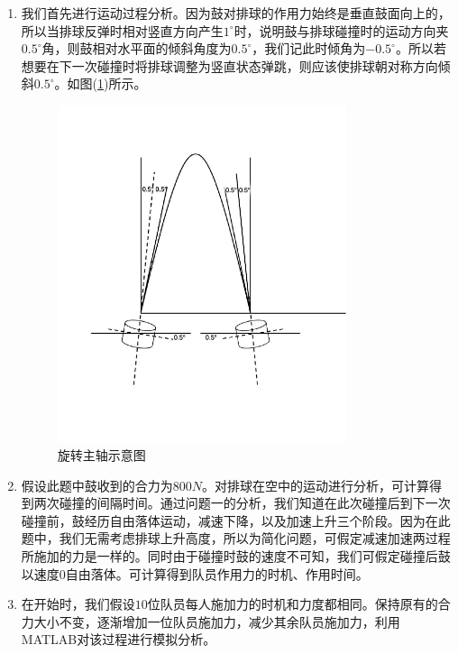 \documentclass{cumcm}
\begin{document}
\begin{enumerate}
\item 我们首先进行运动过程分析。因为鼓对排球的作用力始终是垂直鼓面向上的，所以当排球反弹时相对竖直方向产生$1^{\circ}$时，说明鼓与排球碰撞时的运动方向夹$0.5^{\circ}$角，则鼓相对水平面的倾斜角度为$0.5^{\circ}$，我们记此时倾角为$-0.5^{\circ}$。所以若想要在下一次碰撞时将排球调整为竖直状态弹跳，则应该使排球朝对称方向倾斜$0.5^{\circ}$。如图(\ref{fig:exercise})所示。
\begin{figure}[H]
\centering
\includegraphics[width=0.8\textwidth]{img/exercise.pdf}
\caption{旋转主轴示意图}\label{fig:exercise}
\end{figure}
\item 假设此题中鼓收到的合力为$800N$。对排球在空中的运动进行分析，可计算得到两次碰撞的间隔时间。通过问题一的分析，我们知道在此次碰撞后到下一次碰撞前，鼓经历自由落体运动，减速下降，以及加速上升三个阶段。因为在此题中，我们无需考虑排球上升高度，所以为简化问题，可假定减速加速两过程所施加的力是一样的。同时由于碰撞时鼓的速度不可知，我们可假定碰撞后鼓以速度0自由落体。可计算得到队员作用力的时机、作用时间。
\item 在开始时，我们假设$10$位队员每人施加力的时机和力度都相同。保持原有的合力大小不变，逐渐增加一位队员施加力，减少其余队员施加力，利用MATLAB对该过程进行模拟分析。
\end{enumerate}
\end{document}
